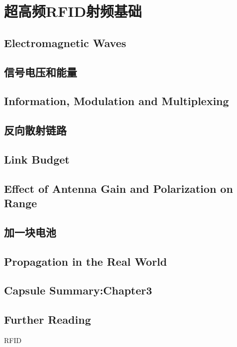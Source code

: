 \chapter{超高频RFID射频基础}

\section{Electromagnetic Waves}

\section{信号电压和能量}

\section{Information, Modulation and Multiplexing}

\section{反向散射链路}

\section{Link Budget}

\section{Effect of Antenna Gain and Polarization on Range}

\section{加一块电池}

\section{Propagation in the Real World}

\section{Capsule Summary:Chapter3}

\section*{Further Reading}

\begin{problemset}
    \item RFID
\end{problemset}